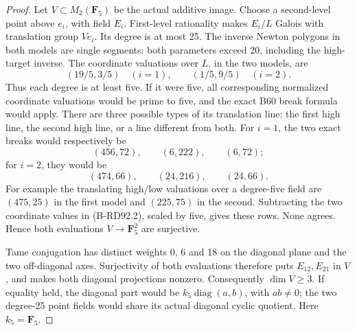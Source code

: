 \begin{proof}
Let \(V\subset M_2(\mathbf F_5)\) be the actual additive image.
Choose a second-level point above \(e_i\), with field \(E_i\).
First-level rationality makes \(E_i/L\) Galois with translation
group \(Ve_i\). Its degree is at most 25. The inverse Newton
polygons in both models are single segments: both parameters exceed
20, including the high-target inverse. The coordinate valuations
over \(L\), in the two models, are
\[
  (19/5,3/5)\quad(i=1),\qquad
  (1/5,9/5)\quad(i=2).                                \tag{B-RD92.2}
\]
Thus each degree is at least five. If it were five, all corresponding
normalized coordinate valuations would be prime to five, and the
exact B60 break formula would apply. There are three possible types
of its translation line: the first high line, the second high line,
or a line different from both. For \(i=1\), the two exact breaks
would respectively be
\[
          (456,72),\qquad(6,222),\qquad(6,72);
                                                        \tag{B-RD92.3}
\]
for \(i=2\), they would be
\[
          (474,66),\qquad(24,216),\qquad(24,66).
                                                        \tag{B-RD92.4}
\]
For example the translating high/low valuations over a degree-five
field are \((475,25)\) in the first model and \((225,75)\) in the
second. Subtracting the two coordinate values in (B-RD92.2), scaled
by five, gives these rows. None agrees. Hence both evaluations
\(V\to\mathbf F_5^2\) are surjective.

Tame conjugation has distinct weights 0, 6 and 18 on the diagonal
plane and the two off-diagonal axes. Surjectivity of both evaluations
therefore puts \(E_{12},E_{21}\) in \(V\), and makes both diagonal
projections nonzero. Consequently \(\dim V\ge3\). If equality
held, the diagonal part would be \(k_5\operatorname{diag}(a,b)\),
with \(ab\ne0\); the two degree-25 point fields would share its
actual diagonal cyclic quotient. Here \(k_5=\mathbf F_5\).


\end{proof}
